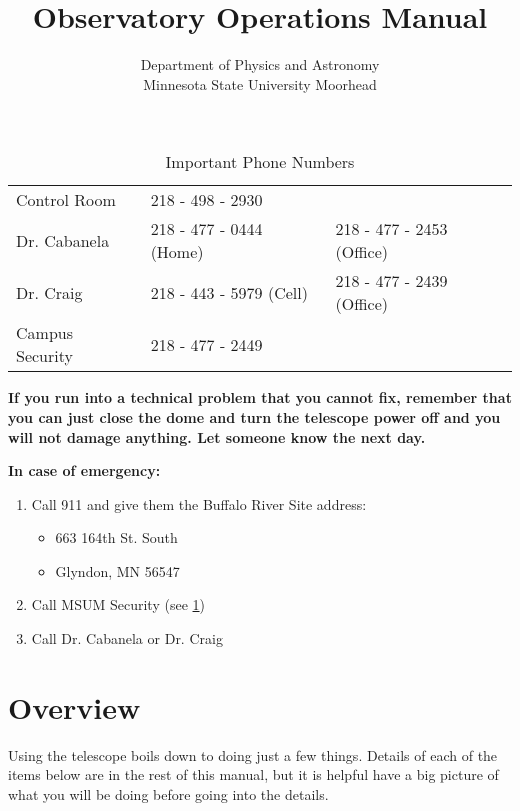 \documentclass[letterpaper, 12pt]{report}
\begin{document}
\title{Observatory Operations Manual}
\author{Department of Physics and Astronomy\\
	Minnesota State University Moorhead}
\maketitle
\tableofcontents
\newpage

\begin{table}[]
	\centering
	\caption{Important Phone Numbers}
	\label{tbl-phone-numbers}
	\begin{tabular}{lll}
		\hline
		Control Room    & 218 - 498 - 2930        &                           \\
		Dr. Cabanela    & 218 - 477 - 0444 (Home) & 218 - 477 - 2453 (Office) \\
		Dr. Craig       & 218 - 443 - 5979 (Cell) & 218 - 477 - 2439 (Office) \\
		Campus Security & 218 - 477 - 2449        &                           \\
	\end{tabular}
\end{table}

\textbf{If you run into a technical problem that you cannot fix, remember that you can just close the dome and turn the telescope power off and you will not damage anything. Let someone know the next day.} \\

\vspace{.25in}

{\huge\textbf{In case of emergency:}}
\begin{enumerate}
	\item Call 911 and give them the Buffalo River Site address:
	\begin{itemize}
		\item [] 663 164th St. South
		\item [] Glyndon, MN 56547
	\end{itemize}
	\item Call MSUM Security (see \ref{tbl-phone-numbers})
	\item Call Dr. Cabanela or Dr. Craig %
\end{enumerate}

\newpage

\chapter{Overview} \label{ch:1}
Using the telescope boils down to doing just a few things. Details of each of the items below are in the rest of this manual, but it is helpful have a big picture of what you will be doing before going into the details.
\end{document}
